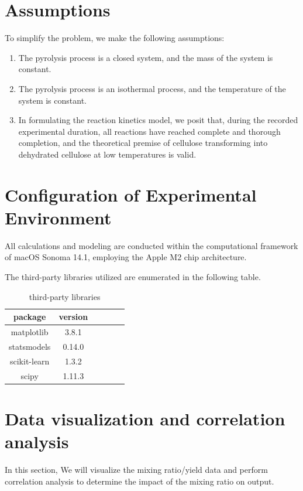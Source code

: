 \documentclass{swmcmthesis}
\begin{document}
\section{Assumptions}

To simplify the problem, we make the following assumptions:

\begin{enumerate}
\item The pyrolysis process is a closed system, and the mass of the system is constant.
\item The pyrolysis process is an isothermal process, and the temperature of the system is constant.
\item In formulating the reaction kinetics model, we posit that, during the recorded experimental duration, all reactions have reached complete and thorough completion, and the theoretical premise of cellulose transforming into dehydrated cellulose at low temperatures is valid.
\end{enumerate}

\section{Configuration of Experimental Environment}

All calculations and modeling are conducted within the computational framework of macOS Sonoma 14.1, employing the Apple M2 chip architecture.

The third-party libraries utilized are enumerated in the following table.
\newpage
\begin{table}[h!t]
    \centering
    \caption{third-party libraries}
    \label{tbl:label}
    \begin{tabular}{cccccc}
    \toprule
    package & version  \\
    \midrule
    matplotlib & 3.8.1 \\
    statsmodels & 0.14.0 \\
    scikit-learn & 1.3.2 \\
    scipy & 1.11.3   \\
    \bottomrule
    \end{tabular}
\end{table}

\section{Data visualization and correlation analysis}

In this section, We will visualize the mixing ratio/yield data and perform correlation analysis to determine the impact of the mixing ratio on output.
\end{document}
